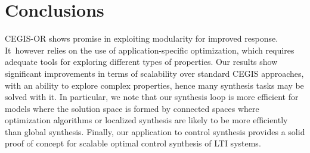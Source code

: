 \documentclass[sigconf]{llncs}
\begin{document}




\section{Conclusions}
\label{sec:conclusions}

CEGIS-OR shows promise in exploiting modularity for improved response. 
It~however relies on the use of application-specific optimization, which
requires adequate tools for exploring different types of properties.  Our
results show significant improvements in terms of scalability over standard
CEGIS approaches, with an ability to explore complex properties, hence many
synthesis tasks may be solved with it.  In particular, we note that our
synthesis loop is more efficient for models where the solution space is
formed by connected spaces where optimization algorithms or localized
synthesis are likely to be more efficiently than global synthesis.  Finally,
our application to control synthesis provides a solid proof of concept for
scalable optimal control synthesis of LTI systems.
\end{document}
